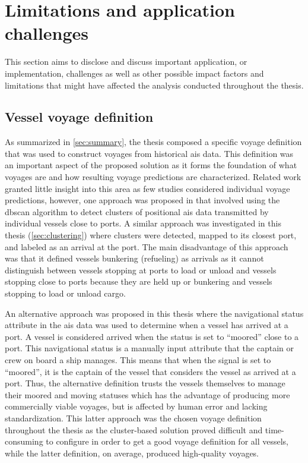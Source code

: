 \section{Limitations and application challenges}

This section aims to disclose and discuss important application, or implementation, challenges as well as other possible impact factors and limitations that might have affected the analysis conducted throughout the thesis.

\subsection{Vessel voyage definition}

As summarized in \cref{sec:summary}, the thesis composed a specific voyage definition that was used to construct voyages from historical \acrshort{ais} data. This definition was an important aspect of the proposed solution as it forms the foundation of what voyages are and how resulting voyage predictions are characterized. Related work granted little insight into this area as few studies considered individual voyage predictions, however, one approach was proposed in \cite{Zhang2020AISApproach} that involved using the \acrshort{dbscan} algorithm to detect clusters of positional \acrshort{ais} data transmitted by individual vessels close to ports. A similar approach was investigated in this thesis (\cref{sec:clustering}) where clusters were detected, mapped to its closest port, and labeled as an arrival at the port. The main disadvantage of this approach was that it defined vessels bunkering (refueling) as arrivals as it cannot distinguish between vessels stopping at ports to load or unload and vessels stopping close to ports because they are held up or bunkering and vessels stopping to load or unload cargo.

An alternative approach was proposed in this thesis where the navigational status attribute in the \acrshort{ais} data was used to determine when a vessel has arrived at a port. A vessel is considered arrived when the status is set to ``moored'' close to a port. This navigational status is a manually input attribute that the captain or crew on board a ship manages. This means that when the signal is set to ``moored'', it is the captain of the vessel that considers the vessel as arrived at a port. Thus, the alternative definition trusts the vessels themselves to manage their moored and moving statuses which has the advantage of producing more commercially viable voyages, but is affected by human error and lacking standardization. This latter approach was the chosen voyage definition throughout the thesis as the cluster-based solution proved difficult and time-consuming to configure in order to get a good voyage definition for all vessels, while the latter definition, on average, produced high-quality voyages.

